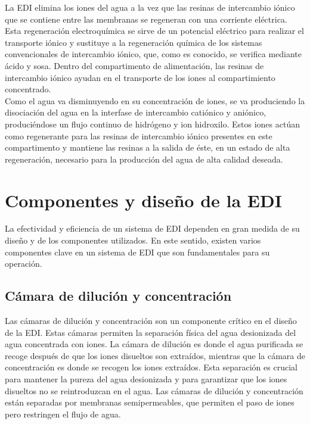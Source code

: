 
La EDI elimina los iones del agua a la vez que las resinas de intercambio iónico que se contiene entre las membranas se
regeneran con una corriente eléctrica. Esta regeneración electroquímica se sirve de un potencial eléctrico para realizar el
transporte iónico y sustituye a la regeneración química de los sistemas convencionales de intercambio iónico, que, como es conocido,
se verifica mediante ácido y sosa. Dentro del compartimento de alimentación, las resinas de intercambio iónico ayudan en el transporte de los iones al compartimiento concentrado.\\

Como el agua va disminuyendo en su concentración de iones, se va produciendo la disociación del agua en la interfase de intercambio
catiónico y aniónico, produciéndose un flujo continuo de hidrógeno y ion hidroxilo. Estos iones actúan como regenerante para las resinas
de intercambio iónico presentes en este compartimento y mantiene las resinas a la salida de éste, en un estado de alta regeneración,
necesario para la producción del agua de alta calidad deseada.\\



\section{Componentes y diseño de la EDI}
La efectividad y eficiencia de un sistema de EDI dependen en gran medida de su diseño y de los componentes utilizados.
En este sentido, existen varios componentes clave en un sistema de EDI que son fundamentales para su operación. \\

\subsection{Cámara de dilución y concentración}
Las cámaras de dilución y concentración son un componente crítico en el diseño de la EDI. Estas cámaras permiten la separación
física del agua desionizada del agua concentrada con iones. La cámara de dilución es donde el agua purificada se recoge después
de que los iones disueltos son extraídos, mientras que la cámara de concentración es donde se recogen los iones extraídos.
Esta separación es crucial para mantener la pureza del agua desionizada y para garantizar que los iones disueltos no se
reintroduzcan en el agua. Las cámaras de dilución y concentración están separadas por membranas semipermeables, que permiten
el paso de iones pero restringen el flujo de agua. \\

